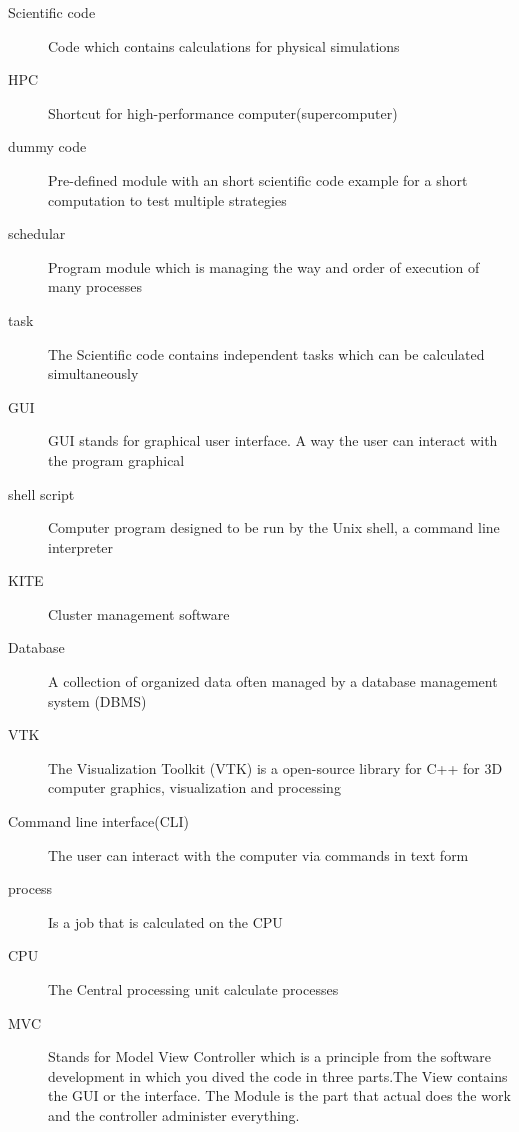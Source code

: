 \begin{description}
	\item[Scientific code] Code which contains calculations for physical simulations
	
	\item[HPC] Shortcut for high-performance computer(supercomputer)
	
	\item[dummy code] Pre-defined module with an short scientific code example for a short computation to test multiple strategies
	
	\item[schedular] Program module which is managing the way and order of execution of many processes
	
	\item[task] The Scientific code contains independent tasks which can be calculated simultaneously
	
	\item[GUI] GUI stands for graphical user interface. A way the user can interact with the program graphical
	
	\item[shell script] Computer program designed to be run by the Unix shell, a command line interpreter
	
	\item[KITE] Cluster management software
	
	\item[Database] A collection of organized data often managed by a database management system (DBMS)
	
	\item[VTK] The Visualization Toolkit (VTK)  is a open-source library for C++ for 3D computer graphics, visualization and processing
	
	\item[Command line interface(CLI)] The user can interact with the computer via commands in text form
	
	\item[process] Is a job that is calculated on the CPU
	
	
	\item[CPU] The Central processing unit calculate processes
	
	\item[MVC] Stands for Model View Controller which is a principle from the software development in which you dived the code in three parts.The View contains the GUI or the interface. The Module is the part that actual does the work and the controller administer everything.

\end{description}
